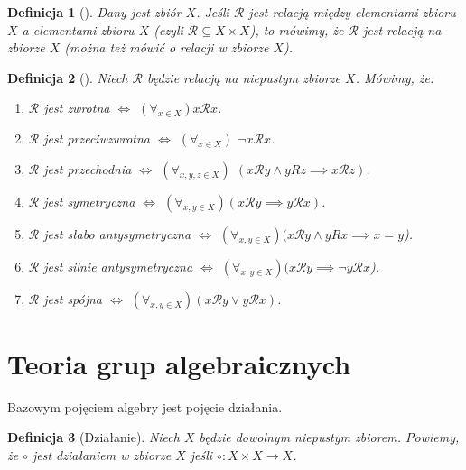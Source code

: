 \documentclass[12pt,a4paper]{report}
\newtheorem{definition}{Definicja}[chapter]
\begin{document}
\begin{definition}[\citep{kraszewski2007wstkep}]
Dany jest zbiór $X$. Jeśli $\mathcal{R}$ jest relacją między elementami zbioru $X$ a elementami zbioru $X$ (czyli $\mathcal{R}\subseteq X \times X$), to mówimy, że $\mathcal{R}$ jest relacją na zbiorze $X$ (można też mówić o relacji w zbiorze $X$).
\end{definition}


\begin{definition}[\citep{kraszewski2007wstkep}]
Niech $\mathcal{R}$ będzie relacją na niepustym zbiorze $X$. Mówimy, że:
\begin{enumerate}
\item
$\mathcal{R}$ jest zwrotna $\iff$ $(\forall_{x\in X}) x\mathcal{R}x$.
\item
$\mathcal{R}$ jest przeciwzwrotna $\iff$ $(\forall_{x\in X})$ $\neg x\mathcal{R}x$.
\item
$\mathcal{R}$ jest przechodnia $\iff$ $(\forall_{x,y,z\in X})$ $(x\mathcal{R}y\land yRz  \implies x\mathcal{R}z)$.
\item
$\mathcal{R}$ jest symetryczna $\iff$ $(\forall_{x,y\in X})(x\mathcal{R}y \implies y\mathcal{R}x)$. 
\item
$\mathcal{R}$ jest słabo antysymetryczna $\iff$ $(\forall_{x,y\in X})( x\mathcal{R}y \land yRx \implies x=y$).
\item
$\mathcal{R}$ jest silnie antysymetryczna $\iff$ $(\forall_{x,y\in X})(x\mathcal{R}y \implies \neg y\mathcal{R}x$).
\item
$\mathcal{R}$ jest spójna $\iff$ $(\forall_{x,y\in X})(x\mathcal{R}y \lor y\mathcal{R}x)$.

\end{enumerate}
\end{definition}
\section{Teoria grup algebraicznych}

Bazowym pojęciem algebry jest pojęcie działania.

\begin{definition}[Działanie]
Niech $X$ będzie dowolnym niepustym zbiorem. Powiemy, że $\circ$ jest działaniem w zbiorze $X$ jeśli $\circ: X \times X \to X$.
\end{definition}
\end{document}
